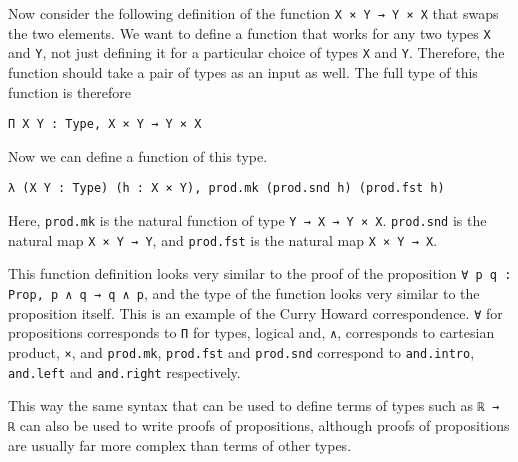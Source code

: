 \documentclass[12pt]{article} %
\theoremstyle{definition}
\theoremstyle{definition}
\theoremstyle{definition}
\theoremstyle{definition}
\begin{document}
Now consider the following definition of the function
\lstinline{X × Y → Y × X} that swaps the two elements. We want to define a function
that works for any two types \lstinline{X} and \lstinline{Y}, not just defining it for
a particular choice of types \lstinline{X} and \lstinline{Y}. Therefore, the
function should take a pair of types as an input as well. The full type of this function
is therefore

\begin{lstlisting}
Π X Y : Type, X × Y → Y × X
\end{lstlisting}

Now we can define a function of this type.

\begin{lstlisting}
λ (X Y : Type) (h : X × Y), prod.mk (prod.snd h) (prod.fst h)
\end{lstlisting}

Here, \lstinline{prod.mk} is the natural function of type \lstinline{Y → X → Y × X}.
\lstinline{prod.snd} is the natural map \lstinline{X × Y → Y}, and \lstinline{prod.fst}
is the natural map \lstinline{X × Y → X}.

This function definition looks very similar to the proof of the proposition
\lstinline{∀ p q : Prop, p ∧ q → q ∧ p}, and the type of the function
looks very similar to the proposition itself. This is an example of the Curry Howard
correspondence.
\lstinline{∀} for propositions corresponds to \lstinline{Π} for types,
logical and, \lstinline{∧}, corresponds to cartesian product, \lstinline{×}, and
\lstinline{prod.mk}, \lstinline{prod.fst} and \lstinline{prod.snd} correspond to
\lstinline{and.intro}, \lstinline{and.left} and \lstinline{and.right} respectively.

This way the same syntax that can be used to define terms of types such as \lstinline{ℝ → ℝ}
can also be used to write proofs of propositions, although proofs of propositions are usually
far more complex than terms of other types.


\end{document}
